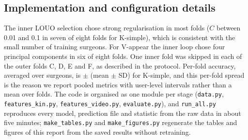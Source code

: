 \subsection{Implementation and configuration details}

The inner LOUO selection chose strong regularisation in most folds ($C$ between 0.01 and 0.1 in seven of eight folds for K-simple), which is consistent with the small number of training surgeons. For V-appear the inner loop chose four principal components in six of eight folds. One inner fold was skipped in each of the outer folds C, D, E and F, as described in the protocol. Per-fold accuracy, averaged over surgeons, is \FoldAccMOne{} $\pm$ \FoldSdMOne{} (mean $\pm$ SD) for K-simple, and this per-fold spread is the reason we report pooled metrics with user-level intervals rather than a mean over folds. The code is organised as one module per stage (\texttt{data.py}, \texttt{features\_kin.py}, \texttt{features\_video.py}, \texttt{evaluate.py}), and \texttt{run\_all.py} reproduces every model, prediction file and statistic from the raw data in about five minutes; \texttt{make\_tables.py} and \texttt{make\_figures.py} regenerate the tables and figures of this report from the saved results without retraining.
